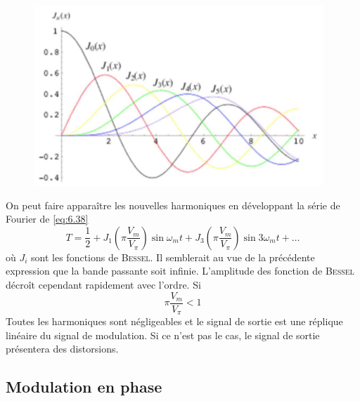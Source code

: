 	\begin{figure}
	\includegraphics[scale=0.4]{ch6/image6}
	\end{figure}
On peut faire apparaître les nouvelles harmoniques en développant la série de Fourier de \eqref{eq:6.38}
\begin{equation}
T = \frac{1}{2}+J_1\left(\pi\dfrac{V_m}{V_\pi}\right)\sin\omega_mt + J_3\left(\pi\dfrac{V_m}{V_\pi}\right)
\sin 3\omega_mt+ \dots
\end{equation}
où $J_i$ sont les fonctions de \textsc{Bessel}. Il semblerait au vue de la précédente expression que 
la bande passante soit infinie. L'amplitude des fonction de \textsc{Bessel} décroît cependant 
rapidement avec l'ordre. Si
\begin{equation}
\pi\dfrac{V_m}{V_\pi} <1
\end{equation}
Toutes les harmoniques sont négligeables et le signal de sortie est une réplique linéaire du signal de
modulation. Si ce n'est pas le cas, le signal de sortie présentera des distorsions.

\newpage
\subsection{Modulation en phase}

